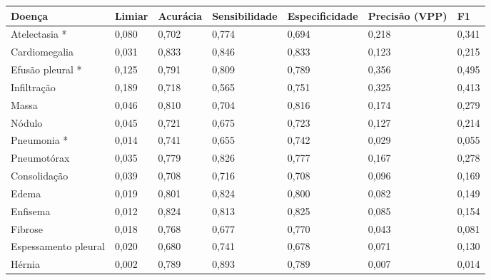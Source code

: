 \begin{tabular}{lllllll}
\toprule
Doença & Limiar & Acurácia & Sensibilidade & Especificidade & Precisão (VPP) & F1 \\
\midrule
Atelectasia * & 0,080 & 0,702 & 0,774 & 0,694 & 0,218 & 0,341 \\
Cardiomegalia & 0,031 & 0,833 & 0,846 & 0,833 & 0,123 & 0,215 \\
Efusão pleural * & 0,125 & 0,791 & 0,809 & 0,789 & 0,356 & 0,495 \\
Infiltração & 0,189 & 0,718 & 0,565 & 0,751 & 0,325 & 0,413 \\
Massa & 0,046 & 0,810 & 0,704 & 0,816 & 0,174 & 0,279 \\
Nódulo & 0,045 & 0,721 & 0,675 & 0,723 & 0,127 & 0,214 \\
Pneumonia * & 0,014 & 0,741 & 0,655 & 0,742 & 0,029 & 0,055 \\
Pneumotórax & 0,035 & 0,779 & 0,826 & 0,777 & 0,167 & 0,278 \\
Consolidação & 0,039 & 0,708 & 0,716 & 0,708 & 0,096 & 0,169 \\
Edema & 0,019 & 0,801 & 0,824 & 0,800 & 0,082 & 0,149 \\
Enfisema & 0,012 & 0,824 & 0,813 & 0,825 & 0,085 & 0,154 \\
Fibrose & 0,018 & 0,768 & 0,677 & 0,770 & 0,043 & 0,081 \\
Espessamento pleural & 0,020 & 0,680 & 0,741 & 0,678 & 0,071 & 0,130 \\
Hérnia & 0,002 & 0,789 & 0,893 & 0,789 & 0,007 & 0,014 \\
\bottomrule
\end{tabular}

